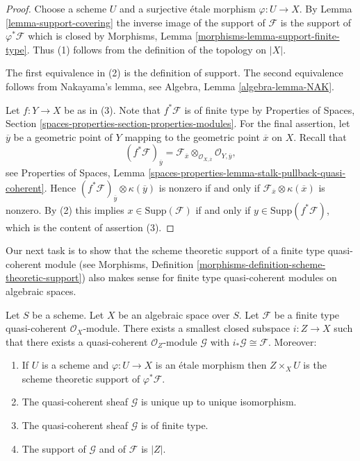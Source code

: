 \begin{proof}
Choose a scheme $U$ and a surjective \'etale morphism $\varphi : U \to X$.
By Lemma \ref{lemma-support-covering} the inverse image of the support of
$\mathcal{F}$ is the support of $\varphi^*\mathcal{F}$ which is closed by
Morphisms, Lemma \ref{morphisms-lemma-support-finite-type}.
Thus (1) follows from the definition of the topology on $|X|$.

\medskip\noindent
The first equivalence in (2) is the definition of support.
The second equivalence follows from Nakayama's lemma, see
Algebra, Lemma \ref{algebra-lemma-NAK}.

\medskip\noindent
Let $f : Y \to X$ be as in (3). Note that $f^*\mathcal{F}$ is of finite type
by Properties of Spaces, Section
\ref{spaces-properties-section-properties-modules}.
For the final assertion, let $\overline{y}$ be a geometric point of $Y$
mapping to the geometric point $\overline{x}$ on $X$. Recall that
$$
(f^*\mathcal{F})_{\overline{y}} =
\mathcal{F}_{\overline{x}} \otimes_{\mathcal{O}_{X, \overline{x}}}
\mathcal{O}_{Y, \overline{y}},
$$
see Properties of Spaces, Lemma
\ref{spaces-properties-lemma-stalk-pullback-quasi-coherent}.
Hence $(f^*\mathcal{F})_{\overline{y}} \otimes \kappa(\overline{y})$
is nonzero if and only if
$\mathcal{F}_{\overline{x}} \otimes \kappa(\overline{x})$ is nonzero.
By (2) this implies $x \in \text{Supp}(\mathcal{F})$ if and only
if $y \in \text{Supp}(f^*\mathcal{F})$, which is the content of
assertion (3).
\end{proof}

\noindent
Our next task is to show that the scheme theoretic support
of a finite type quasi-coherent module (see
Morphisms, Definition \ref{morphisms-definition-scheme-theoretic-support})
also makes sense for finite type quasi-coherent modules on
algebraic spaces.

\begin{lemma}
\label{lemma-scheme-theoretic-support}
Let $S$ be a scheme. Let $X$ be an algebraic space over $S$.
Let $\mathcal{F}$ be a finite type quasi-coherent $\mathcal{O}_X$-module.
There exists a smallest closed subspace $i : Z \to X$ such that there
exists a quasi-coherent $\mathcal{O}_Z$-module $\mathcal{G}$ with
$i_*\mathcal{G} \cong \mathcal{F}$. Moreover:
\begin{enumerate}
\item If $U$ is a scheme and $\varphi : U \to X$ is an \'etale morphism
then $Z \times_X U$ is the scheme theoretic support of $\varphi^*\mathcal{F}$.
\item The quasi-coherent sheaf $\mathcal{G}$ is unique up to unique
isomorphism.
\item The quasi-coherent sheaf $\mathcal{G}$ is of finite type.
\item The support of $\mathcal{G}$ and of $\mathcal{F}$ is $|Z|$.
\end{enumerate}
\end{lemma}

